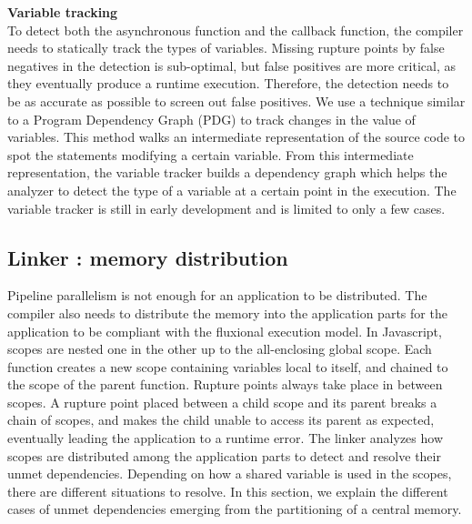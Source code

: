 \textbf{Variable tracking}\\
To detect both the asynchronous function and the callback function, the compiler needs to statically track the types of variables.
Missing rupture points by false negatives in the detection is sub-optimal, but false positives are more critical, as they eventually produce a runtime execution.
Therefore, the detection needs to be as accurate as possible to screen out false positives.
We use a technique similar to a Program Dependency Graph (PDG)\cite{Ferrante1987} to track changes in the value of variables.
This method walks an intermediate representation of the source code to spot the statements modifying a certain variable.
From this intermediate representation, the variable tracker builds a dependency graph which helps the analyzer to detect the type of a variable at a certain point in the execution.
The variable tracker is still in early development and is limited to only a few cases.

\subsection{Linker : memory distribution} \label{section:linker}


Pipeline parallelism is not enough for an application to be distributed.
The compiler also needs to distribute the memory into the application parts for the application to be compliant with the fluxional execution model.
In Javascript, scopes are nested one in the other up to the all-enclosing global scope.
Each function creates a new scope containing variables local to itself, and chained to the scope of the parent function.
Rupture points always take place in between scopes.
A rupture point placed between a child scope and its parent breaks a chain of scopes, and makes the child unable to access its parent as expected, eventually leading the application to a runtime error.
The linker analyzes how scopes are distributed among the application parts to detect and resolve their unmet dependencies.
Depending on how a shared variable is used in the scopes, there are different situations to resolve.
In this section, we explain the different cases of unmet dependencies emerging from the partitioning of a central memory.

